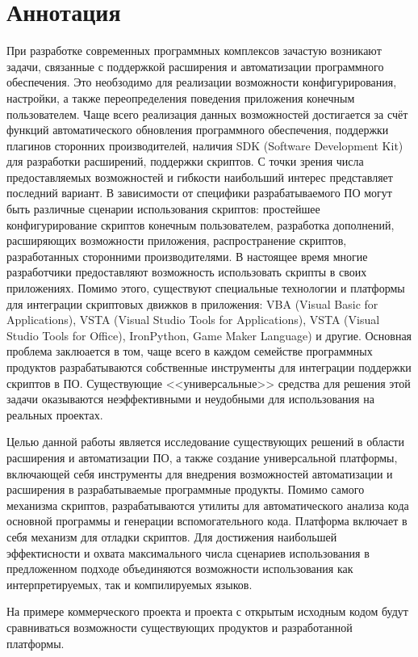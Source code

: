 \setcounter{secnumdepth}{0}
\section*{Аннотация}
\setcounter{secnumdepth}{2}

При разработке современных программных комплексов зачастую возникают задачи, связанные с поддержкой расширения и автоматизации программного обеспечения. Это необзодимо для реализации возможности конфигурирования, настройки, а также переопределения поведения приложения конечным пользователем. Чаще всего реализация данных возможностей достигается за счёт функций автоматического обновления программного обеспечения, поддержки плагинов сторонних производителей, наличия SDK (Software Development Kit) для разработки расширений, поддержки скриптов. С точки зрения числа предоставляемых возможностей и гибкости наибольший интерес представляет последний вариант. В зависимости от специфики разрабатываемого ПО могут быть различные сценарии использования скриптов: простейшее конфигурирование скриптов конечным пользователем, разработка дополнений, расширяющих возможности приложения, распространение скриптов, разработанных сторонними производителями. В настоящее время многие разработчики предоставляют возможность использовать скрипты в своих приложениях. Помимо этого, существуют специальные технологии и платформы для интеграции скриптовых движков в приложения: VBA (Visual Basic for Applications), VSTA (Visual Studio Tools for Applications), VSTA (Visual Studio Tools for Office), IronPython, Game Maker Language) и другие. Основная проблема заклюается в том, чаще всего в каждом семействе программных продуктов разрабатываются собственные инструменты для интеграции поддержки скриптов в ПО. Существующие <<универсальные>> средства для решения этой задачи оказываются неэффективными и неудобными для использования на реальных проектах.

Целью данной работы является исследование существующих решений в области расширения и автоматизации ПО, а также создание универсальной платформы, включающей себя инструменты для внедрения возможностей автоматизации и расширения в разрабатываемые программные продукты. Помимо самого механизма скриптов, разрабатываются утилиты для автоматического анализа кода основной программы и генерации вспомогательного кода. Платформа включает в себя механизм для отладки скриптов. Для достижения наибольшей эффектисности и охвата максимального числа сценариев использования в предложенном подходе объединяются возможности использования как интерпретируемых, так и компилируемых языков. 

На примере коммерческого проекта и проекта с открытым исходным кодом будут сравниваться возможности существующих продуктов и разработанной платформы. 
\pagebreak